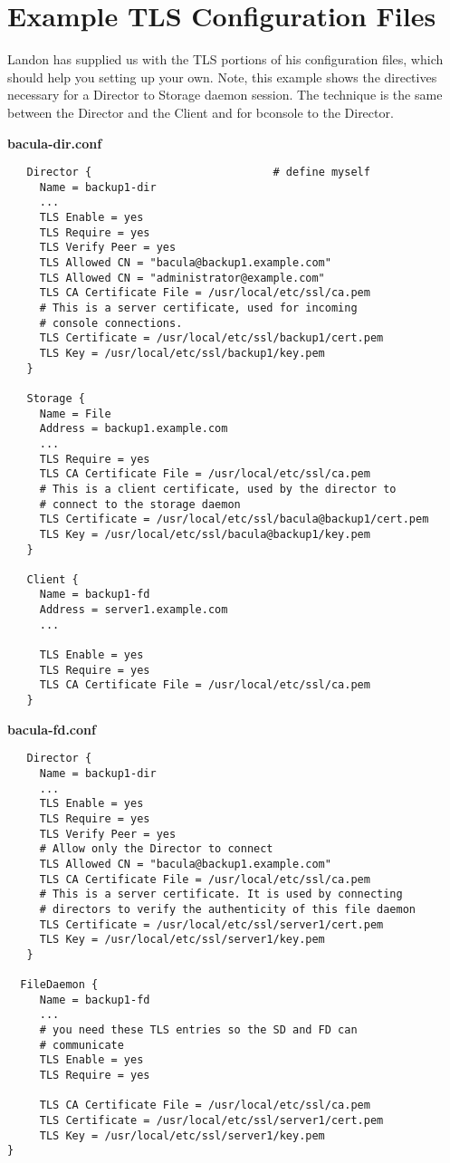\section{Example TLS Configuration Files}

Landon has supplied us with the TLS portions of his configuration
files, which should help you setting up your own.  Note, this example
shows the directives necessary for a Director to Storage daemon session.
The technique is the same between the Director and the Client and
for bconsole to the Director.

{\bf bacula-dir.conf}
\footnotesize
\begin{verbatim}
   Director {                            # define myself
     Name = backup1-dir
     ...
     TLS Enable = yes
     TLS Require = yes
     TLS Verify Peer = yes
     TLS Allowed CN = "bacula@backup1.example.com"
     TLS Allowed CN = "administrator@example.com"
     TLS CA Certificate File = /usr/local/etc/ssl/ca.pem
     # This is a server certificate, used for incoming
     # console connections.
     TLS Certificate = /usr/local/etc/ssl/backup1/cert.pem
     TLS Key = /usr/local/etc/ssl/backup1/key.pem
   }

   Storage {
     Name = File
     Address = backup1.example.com
     ...
     TLS Require = yes
     TLS CA Certificate File = /usr/local/etc/ssl/ca.pem
     # This is a client certificate, used by the director to
     # connect to the storage daemon
     TLS Certificate = /usr/local/etc/ssl/bacula@backup1/cert.pem
     TLS Key = /usr/local/etc/ssl/bacula@backup1/key.pem
   }

   Client {
     Name = backup1-fd
     Address = server1.example.com
     ...
   
     TLS Enable = yes
     TLS Require = yes
     TLS CA Certificate File = /usr/local/etc/ssl/ca.pem
   }

\end{verbatim}
\normalsize

{\bf bacula-fd.conf}
\footnotesize
\begin{verbatim}
   Director {
     Name = backup1-dir
     ...
     TLS Enable = yes
     TLS Require = yes
     TLS Verify Peer = yes
     # Allow only the Director to connect
     TLS Allowed CN = "bacula@backup1.example.com"
     TLS CA Certificate File = /usr/local/etc/ssl/ca.pem
     # This is a server certificate. It is used by connecting
     # directors to verify the authenticity of this file daemon
     TLS Certificate = /usr/local/etc/ssl/server1/cert.pem
     TLS Key = /usr/local/etc/ssl/server1/key.pem
   }

  FileDaemon {
     Name = backup1-fd
     ...
     # you need these TLS entries so the SD and FD can
     # communicate
     TLS Enable = yes
     TLS Require = yes

     TLS CA Certificate File = /usr/local/etc/ssl/ca.pem
     TLS Certificate = /usr/local/etc/ssl/server1/cert.pem
     TLS Key = /usr/local/etc/ssl/server1/key.pem
}
\end{verbatim}
\normalsize

